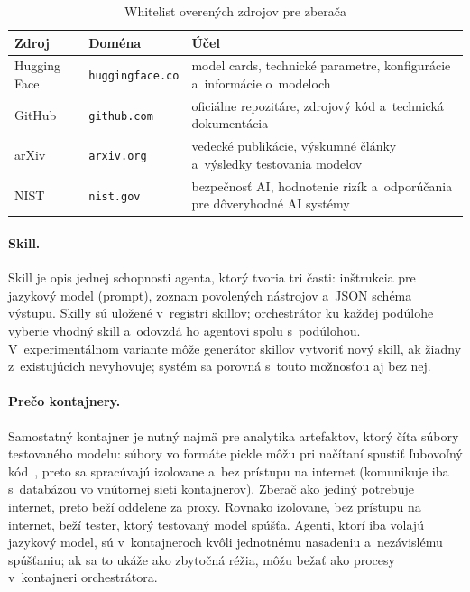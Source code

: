 \begin{table}[ht]
    \centering
    \caption{Whitelist overených zdrojov pre zberača}
    \label{tab:whitelist}
    \small
    \begin{tabular}{@{}>{\raggedright\arraybackslash}p{2.4cm}>{\raggedright\arraybackslash}p{3.2cm}>{\raggedright\arraybackslash}p{8.6cm}@{}}
        \toprule
        \textbf{Zdroj} & \textbf{Doména} & \textbf{Účel} \\
        \midrule
        Hugging Face & \texttt{huggingface.co} & model cards, technické
            parametre, konfigurácie a~informácie o~modeloch \\
        GitHub & \texttt{github.com} & oficiálne repozitáre, zdrojový kód
            a~technická dokumentácia \\
        arXiv & \texttt{arxiv.org} & vedecké publikácie, výskumné články
            a~výsledky testovania modelov \\
        NIST & \texttt{nist.gov} & bezpečnosť AI, hodnotenie rizík
            a~odporúčania pre dôveryhodné AI systémy \\
        \bottomrule
    \end{tabular}
\end{table}

\paragraph{Skill.} Skill je opis jednej schopnosti agenta, ktorý tvoria
tri časti: inštrukcia pre jazykový model (prompt), zoznam povolených
nástrojov a~JSON schéma výstupu. Skilly sú uložené v~registri skillov;
orchestrátor ku každej podúlohe vyberie vhodný skill a~odovzdá ho agentovi
spolu s~podúlohou. V~experimentálnom variante môže generátor skillov
vytvoriť nový skill, ak žiadny z~existujúcich nevyhovuje; systém sa
porovná s~touto možnosťou aj bez nej.

\paragraph{Prečo kontajnery.} Samostatný kontajner je nutný najmä pre
analytika artefaktov, ktorý číta súbory testovaného modelu: súbory vo
formáte pickle môžu pri načítaní spustiť ľubovoľný kód~\cite{hf-pickle},
preto sa spracúvajú izolovane a~bez prístupu na internet (komunikuje iba
s~databázou vo vnútornej sieti kontajnerov). Zberač ako jediný potrebuje
internet, preto beží oddelene za proxy. Rovnako izolovane, bez prístupu
na internet, beží tester, ktorý testovaný model spúšťa. Agenti, ktorí iba volajú
jazykový model, sú v~kontajneroch kvôli jednotnému nasadeniu a~nezávislému
spúšťaniu; ak sa to ukáže ako zbytočná réžia, môžu bežať ako procesy
v~kontajneri orchestrátora.

